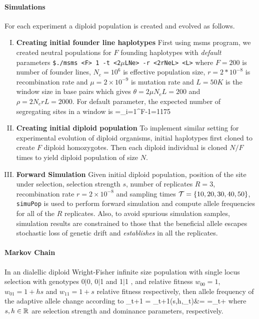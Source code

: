 \documentclass[11pt]{article}
\begin{document}
\paragraph{Simulations}
For each experiment a diploid population is created and evolved as 
follows. 
\begin{enumerate}[I.]
	\item {\bf Creating initial founder line haplotypes}
	First using msms program, we created neutral populations for $F$ 
	founding 
	haplotypes with \emph{default} parameters \texttt{\$./msms <F> 1 
	-t 
		<2$\mu$LNe> 
		-r <2rNeL> 
		<L>} 
	where $F=200$ is number of founder lines, $N_e=10^6$ is 
	effective 
	population size, $r=2*10^{-8}$ is recombination rate and 
	$\mu=2\times 
	10^{-9}$ is mutation rate and  $L=50K$ is the window size in 
	base pairs 
	which gives $\theta=2\mu N_eL=200$ and $\rho=2N_erL=2000$. 
	For 
	default 
	parameter, the expected number of segregating sites in a window 
	is 
	\beqq
	\Ebb[M]=\theta \sum_{i=1}^{F-1}=1175
	\eeqq
	\item{\bf Creating initial diploid population} 
	To implement similar setting for experimental evolution of diploid 
	organisms, 
	initial  haplotypes first cloned to create $F$ diploid homozygotes. 
	Then 
	each 
	diploid individual is  cloned $N/F$ times to yield diploid 
	population of 
	size 
	$N$.
	\item{\bf Forward Simulation}
	Given initial diploid population, position of the site under 
	selection, 
	selection 
	strength $s$, number of replicates $R=3$, recombination rate 
	$r=2\times10^{-8}$ 
	and sampling times ${\cal T}=\{10,20,30,40,50\}$, \texttt{simuPop} is 
	used to 
	perform
	forward simulation and  compute allele frequencies for all of the 
	$R$ 
	replicates. Also, to avoid spurious simulation samples, simulation 
	results 
	are constrained to those that the beneficial allele escapes 
	stochastic loss 
	of genetic drift and \emph{establishes} in all the replicates. 
\end{enumerate}


\paragraph{Markov Chain}\label{sec:comale}
In an dialellic diploid Wright-Fisher infinite size population with single locus selection with genotypes 0$|$0, 0$|$1 and 1$|$1 , and relative fitness $w_{00}=1$, $w_{01}=1+hs$ and  $w_{11}=1+s$ relative fitness respectively, then allele frequency of the adaptive allele change according to
\beq
\hat{\nu}_{t+1} = \nu_{t+1}(s,h,\nu_t)&= =\nu_t+
\label{eq:transition}
\eeq
where $s,h\in {\mathbb R}$ are selection strength and dominance parameters, respectively. 
\end{document}
